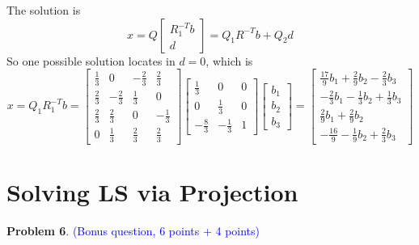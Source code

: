 \documentclass[english,onecolumn]{IEEEtran}
\begin{document}
\begin{enumerate}
   	The solution is
   	$$x = Q\begin{bmatrix}
   			R_1^{-T}b\\d
   		\end{bmatrix}=Q_1R^{-T}b+Q_2d$$
   	So one possible solution locates in $d=0$, which is 
   	$$x = Q_1R_1^{-T}b=\begin{bmatrix}
    		\frac{1}{3} & 0 & -\frac{2}{3} &\frac{2}{3}\\
    		\frac{2}{3} & -\frac{2}{3} &\frac{1}{3} & 0\\
    		\frac{2}{3} & \frac{2}{3} & 0 & -\frac{1}{3}\\
    		0 & \frac{1}{3} & \frac{2}{3} & \frac{2}{3}
    	\end{bmatrix}\begin{bmatrix}
    		\frac{1}{3} & 0 & 0\\
    		0 & \frac{1}{3} & 0\\
    		-\frac{8}{3} & -\frac{1}{3} & 1
    	\end{bmatrix}\begin{bmatrix}
    		b_1\\b_2\\b_3
    	\end{bmatrix} = \begin{bmatrix}
    		\frac{17}{9}b_1 +\frac{2}{9}b_2-\frac{2}{3}b_3\\
    		-\frac{2}{3}b_1 - \frac{1}{3}b_2+\frac{1}{3}b_3\\
    		\frac{2}{9}b_1+\frac{2}{9}b_2\\
    		-\frac{16}{9}-\frac{1}{9}b_2+\frac{2}{3}b_3
    	\end{bmatrix}$$
\end{enumerate}

\newpage
\section{Solving LS via Projection}
\noindent\textbf{Problem 6}. \textcolor{blue}{(Bonus question, 6 points + 4 points)}
\end{document}
